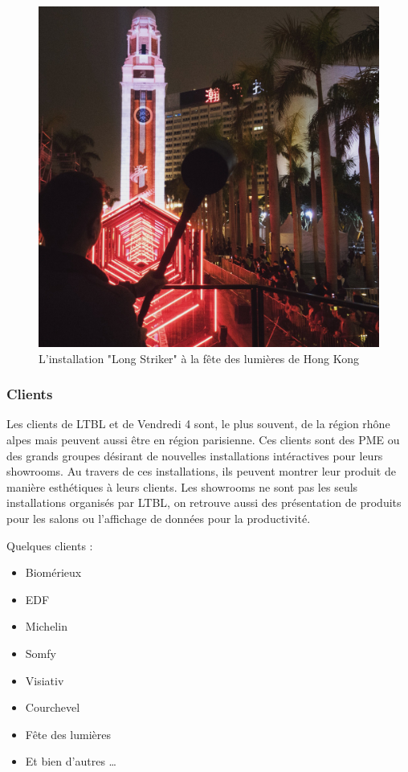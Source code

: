 \documentclass{article}
\begin{document}
\begin{figure}[h]
    \centering
    \includegraphics[scale=0.15]{long-striker.jpg}
    \caption{L'installation "Long Striker" à la fête des lumières de Hong Kong}
\end{figure}

\clearpage

\subsubsection{Clients}

Les clients de LTBL et de Vendredi 4 sont, le plus souvent, de la région rhône alpes mais peuvent aussi être en région parisienne.
Ces clients sont des PME ou des grands groupes désirant de nouvelles installations intéractives pour leurs showrooms.
Au travers de ces installations, ils peuvent montrer leur produit de manière esthétiques à leurs clients.
Les showrooms ne sont pas les seuls installations organisés par LTBL, on retrouve aussi des présentation de produits pour les salons ou l'affichage de données pour la productivité.

\medskip

Quelques clients :

\begin{itemize}
    \item Biomérieux
    \item EDF
    \item Michelin
    \item Somfy
    \item Visiativ
    \item Courchevel
    \item Fête des lumières
    \item Et bien d'autres \ldots
\end{itemize}
\end{document}
